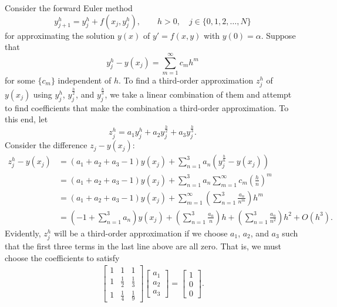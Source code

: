 \documentclass{homework}
\begin{document}
	\question Consider the forward Euler method
	\begin{equation}
		y_{j+1}^h = y_{j}^h + f(x_j, y_{j}^h), \qquad h > 0,\quad j \in \{0,1,2,\dots, N\}
	\end{equation}
	for approximating the solution $y(x)$ of $y' = f(x,y)$ with $y(0) = \alpha$. Suppose that
	\begin{equation}
		y_j^h - y(x_j) = \sum_{m=1}^\infty c_mh^m
	\end{equation}
	for some $\{c_m\}$ independent of $h$. To find a third-order approximation $z_j^h$ of $y(x_j)$ using $y_j^h$, $y_j^{\frac{h}{2}}$, and $y_j^{\frac{h}{3}}$, we take a linear combination of them and attempt to find coefficients that make the combination a third-order approximation. To this end, let
	\begin{equation}
		z_j^h = a_1y_j^h + a_2y_j^\frac{h}{2} + a_3 y_j^{\frac{h}{3}}.
	\end{equation}
	Consider the difference $z_j - y(x_j)$:
	\begin{align}
		z_j^h - y(x_j) &= (a_1 + a_2+a_3 - 1)y(x_j) + \sum_{n=1}^3 a_n \left(y_j^\frac{h}{n} - y(x_j)\right) \\
		&= (a_1+a_2+a_3-1)y(x_j) + \sum_{n=1}^3 a_n\sum_{m=1}^\infty c_m\left(\frac{h}{n}\right)^m \\
		&= (a_1 + a_2+a_3-1)y(x_j) + \sum_{m=1}^\infty \left(\sum_{n=1}^3 \frac{a_n}{n^m}\right)h^m \\
		&= \left(-1  + \sum_{n=1}^3a_n\right)y(x_j) +\left(\sum_{n=1}^3\frac{a_n}{n}\right)h + \left(\sum_{n=1}^3\frac{a_n}{n^2}\right)h^2 + O(h^3).
	\end{align}
	Evidently, $z_j^h$ will be a third-order approximation if we choose $a_1$, $a_2$, and $a_3$ such that the first three terms in the last line above are all zero. That is, we must choose the coefficients to satisfy
	\begin{align}
		\left[\begin{matrix}
			1 & 1 & 1 \\
			1 & \frac{1}{2} & \frac{1}{3} \\
			1 & \frac{1}{4} & \frac{1}{9}
		\end{matrix}\right]\left[\begin{matrix}
		a_1 \\ a_2 \\ a_3
		\end{matrix}\right] = \left[\begin{matrix}
		1 \\ 0 \\ 0
		\end{matrix}\right].
	\end{align}
\end{document}
